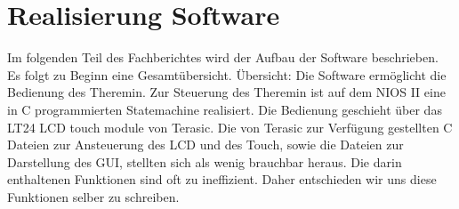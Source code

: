 \clearpage
\section{Realisierung Software}\label{sec:Realisierung_Software}
Im folgenden Teil des Fachberichtes wird der Aufbau der Software beschrieben. Es folgt zu Beginn eine Gesamtübersicht.
Übersicht: 
Die Software ermöglicht die Bedienung des Theremin. Zur Steuerung des Theremin ist auf dem NIOS II eine in C programmierten Statemachine realisiert. Die Bedienung geschieht über das LT24 LCD touch module von Terasic. Die von Terasic zur Verfügung gestellten C Dateien zur Ansteuerung des LCD und des Touch, sowie die Dateien zur Darstellung des GUI, stellten sich als wenig brauchbar heraus. Die darin enthaltenen Funktionen sind oft zu ineffizient. Daher entschieden wir uns diese Funktionen selber zu schreiben.